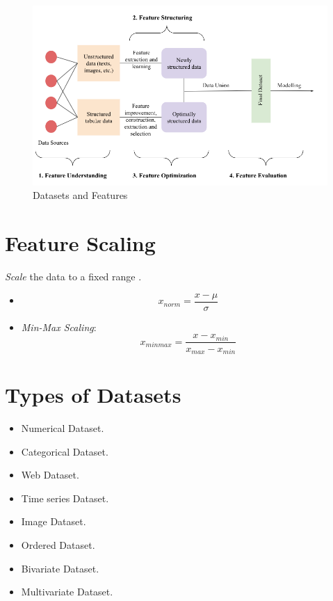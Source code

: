 \documentclass[
	number={1},
	title={Machine Learning Fundamentals}
]{cs584notes}
\begin{document}
\begin{figure}[H]
	\centering
	\includegraphics[width=\textwidth]{figures/1/datasets-and-features}
	\caption{Datasets and Features}
	\label{fig:datasets-and-features}
\end{figure}

\section{Feature Scaling}\label{sec:feature-scaling}
\emph{Scale} the data to a fixed range \data{$[0, 1]$}.
\begin{itemize}
	\item {}
	\begin{equation}
		x_{norm} = \frac{x - \mu}{\sigma}
		\label{eq:normalization}
	\end{equation}
	\item \emph{Min-Max Scaling}:
	\begin{equation}
		x_{minmax} = \frac{x - x_{min}}{x_{max} - x_{min}}
		\label{eq:min-max-scaling}
	\end{equation}
\end{itemize}

\section{Types of Datasets}\label{sec:types-of-datasets}
\begin{itemize}
	\item Numerical Dataset.
	\item Categorical Dataset.
	\item Web Dataset.
	\item Time series Dataset.
	\item Image Dataset.
	\item Ordered Dataset.
	\item Bivariate Dataset.
	\item Multivariate Dataset.
\end{itemize}
\end{document}
